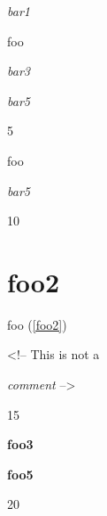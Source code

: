 
\def\mytitle{HTML Blocks}


\emph{bar1}

foo

\emph{bar3}


\emph{bar5}

5

foo

\emph{bar5}

10

\part{foo2 }
\label{foo2}

foo (\autoref{foo2})

<!-- This is not a

\emph{comment} -->

15

\textbf{foo3}

\textbf{foo5}

20




